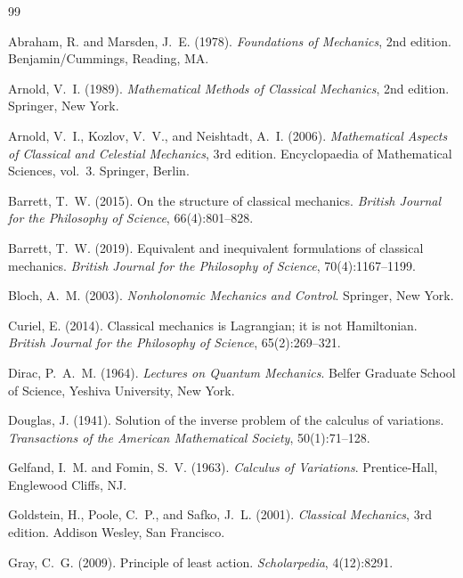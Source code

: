 \documentclass[11pt]{article}
\begin{document}

\begin{thebibliography}{99}

Abraham, R. and Marsden, J.~E. (1978).
\textit{Foundations of Mechanics}, 2nd edition.
Benjamin/Cummings, Reading, MA.

Arnold, V.~I. (1989).
\textit{Mathematical Methods of Classical Mechanics}, 2nd edition.
Springer, New York.

Arnold, V.~I., Kozlov, V.~V., and Neishtadt, A.~I. (2006).
\textit{Mathematical Aspects of Classical and Celestial Mechanics}, 3rd edition.
Encyclopaedia of Mathematical Sciences, vol.~3. Springer, Berlin.

Barrett, T.~W. (2015).
On the structure of classical mechanics.
\textit{British Journal for the Philosophy of Science}, 66(4):801--828.

Barrett, T.~W. (2019).
Equivalent and inequivalent formulations of classical mechanics.
\textit{British Journal for the Philosophy of Science}, 70(4):1167--1199.

Bloch, A.~M. (2003).
\textit{Nonholonomic Mechanics and Control}.
Springer, New York.

Curiel, E. (2014).
Classical mechanics is Lagrangian; it is not Hamiltonian.
\textit{British Journal for the Philosophy of Science}, 65(2):269--321.

Dirac, P.~A.~M. (1964).
\textit{Lectures on Quantum Mechanics}.
Belfer Graduate School of Science, Yeshiva University, New York.

Douglas, J. (1941).
Solution of the inverse problem of the calculus of variations.
\textit{Transactions of the American Mathematical Society}, 50(1):71--128.

Gelfand, I.~M. and Fomin, S.~V. (1963).
\textit{Calculus of Variations}.
Prentice-Hall, Englewood Cliffs, NJ.

Goldstein, H., Poole, C.~P., and Safko, J.~L. (2001).
\textit{Classical Mechanics}, 3rd edition.
Addison Wesley, San Francisco.

Gray, C.~G. (2009).
Principle of least action.
\textit{Scholarpedia}, 4(12):8291.


\end{thebibliography}
\end{document}
